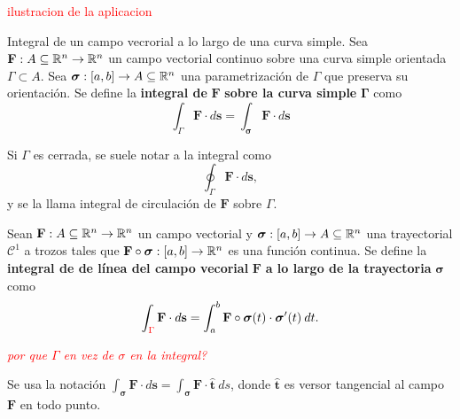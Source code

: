 \textcolor{red}{ilustracion de la aplicacion}

\begin{definition}
    Integral de un campo vecrorial a lo largo de una curva simple.
    Sea $\mathbf{F}:A\subseteq\mathbb{R}^n\to\mathbb{R}^n$ un campo vectorial continuo sobre una curva simple orientada $\Gamma\subset A$. Sea $\boldsymbol{\sigma}:[a,b]\to A\subseteq\mathbb{R}^n$ una parametrizaci\'on de $\Gamma$ que preserva su orientaci\'on. Se define la \textbf{integral de} $\mathbf{F}$ \textbf{sobre la curva simple} $\boldsymbol{\Gamma}$ como
    \[
        \int_{\Gamma}\mathbf{F}\cdot d\mathbf{s}=\int_{\boldsymbol{\sigma}}\mathbf{F}\cdot d\mathbf{s} 
    \]
\end{definition}

Si $\Gamma$ es cerrada, se suele notar a la integral como
\[
    \oint_{\Gamma}\mathbf{F}\cdot d\mathbf{s},  
\]
y se la llama integral de circulaci\'on de $\mathbf{F}$ sobre $\Gamma$.

\begin{definition}
    Sean $\mathbf{F}:A\subseteq\mathbb{R}^n\to\mathbb{R}^n$ un campo vectorial y $\boldsymbol{\sigma}:[a,b]\to A\subseteq\mathbb{R}^n$ una trayectorial $\mathcal{C}^1$ a trozos tales que $\mathbf{F}\circ\boldsymbol{\sigma}:[a,b]\to\mathbb{R}^n$ es una funci\'on continua. Se define la \textbf{integral de de l\'inea del campo vecorial} $\mathbf{F}$ \textbf{a lo largo de la trayectoria} $\boldsymbol{\sigma}$ como
    \[
        \int_{\textcolor{red}{\Gamma}}\mathbf{F}\cdot d\mathbf{s}=\int_a^b\mathbf{F}\circ\boldsymbol{\sigma}(t)\cdot\boldsymbol{\sigma}'(t)\:dt. 
    \]
\end{definition}
\textcolor{red}{\textit{por que $\Gamma$ en vez de $\sigma$ en la integral?}}

Se usa la notaci\'on $\int_{\boldsymbol{\sigma}}\mathbf{F}\cdot d\mathbf{s}=\int_{\boldsymbol{\sigma}}\mathbf{F}\cdot\hat{\mathbf{t}}\:ds$, donde $\hat{\mathbf{t}}$ es versor tangencial al campo $\mathbf{F}$ en todo punto.
